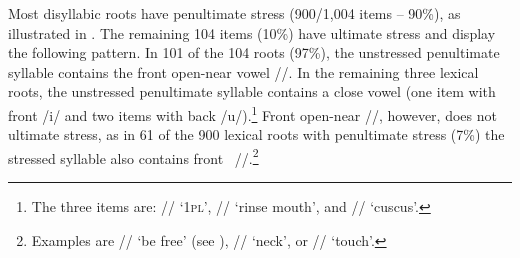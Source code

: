 Most disyllabic roots have penultimate stress (900/1,004 items – 90\%), as illustrated in . The remaining 104 items (10\%) have ultimate stress and display the following pattern. In 101 of the 104 roots (97\%), the unstressed penultimate syllable contains the front open-near vowel //. In the remaining three lexical roots, the unstressed penultimate syllable contains a close vowel (one item with front /i/ and two items with back /u/).\footnote{The three items are:  // ‘\textsc{1pl}’,  // ‘rinse mouth’, and  // ‘cuscus’.} Front open-near //, however, does not  ultimate stress, as in 61 of the 900 lexical roots with penultimate stress (7\%) the stressed syllable also contains front~ //.\footnote{Examples are  // ‘be free’ (see ),  // ‘neck’, or  // ‘touch’.}

